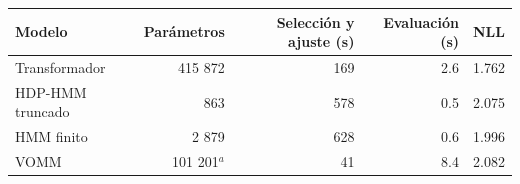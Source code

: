 \begin{tabular}{lrrrr}
\hline
Modelo & Parámetros & Selección y ajuste (s) & Evaluación (s) & NLL \\
\hline
Transformador & 415 872 & 169 & 2.6 & 1.762 \\
HDP-HMM truncado & 863 & 578 & 0.5 & 2.075 \\
HMM finito & 2 879 & 628 & 0.6 & 1.996 \\
VOMM & 101 201$^{a}$ & 41 & 8.4 & 2.082 \\
\hline
\end{tabular}
